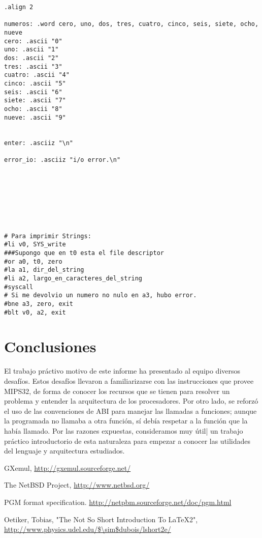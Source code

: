 \documentclass[a4paper,10pt]{article}
\begin{document}
\begin{verbatim}
.align 2

numeros: .word cero, uno, dos, tres, cuatro, cinco, seis, siete, ocho, nueve
cero: .ascii "0"
uno: .ascii "1"
dos: .ascii "2"
tres: .ascii "3"
cuatro: .ascii "4"
cinco: .ascii "5"
seis: .ascii "6"
siete: .ascii "7"
ocho: .ascii "8"
nueve: .ascii "9"


enter: .asciiz "\n"

error_io: .asciiz "i/o error.\n"








# Para imprimir Strings:
#li v0, SYS_write
###Supongo que en t0 esta el file descriptor
#or a0, t0, zero
#la a1, dir_del_string
#li a2, largo_en_caracteres_del_string
#syscall
# Si me devolvio un numero no nulo en a3, hubo error.
#bne a3, zero, exit
#blt v0, a2, exit
\end{verbatim}

\pagebreak



\section{Conclusiones}
El trabajo pr\'activo motivo de este informe ha presentado al equipo diversos desaf\'ios. 
Estos  desaf\'ios llevaron a familiarizarse con las instrucciones que provee MIPS32, de forma 
de conocer los recursos que se tienen para resolver un problema y entender la arquitectura de 
los procesadores. Por otro lado, se reforz\'o el uso de las convenciones de ABI para manejar las 
llamadas a funciones; aunque la programada no llamaba a otra funci\'on, s\'i deb\'ia respetar a la 
funci\'on que la hab\'ia llamado.
Por las razones expuestas, consideramos muy \'util| un trabajo pr\'actico introductorio de esta 
naturaleza para empezar a conocer las utilidades del lenguaje y arquitectura estudiados.\\

\pagebreak

\begin{thebibliography}{99}

 GXemul, \url{http://gxemul.sourceforge.net/}

 The NetBSD Project, \url{http://www.netbsd.org/}

 PGM format specification.
\url{http://netpbm.sourceforge.net/doc/pgm.html}

 Oetiker, Tobias, "The Not So Short Introduction To LaTeX2", \url{http://www.physics.udel.edu/$\sim$dubois/lshort2e/}

\end{thebibliography}
\end{document}

